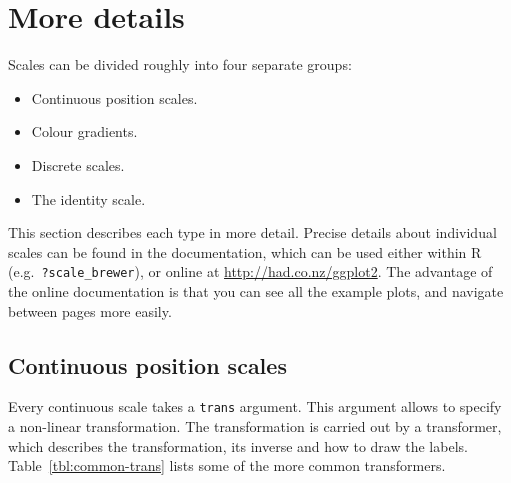 % 



\section{More details}
\label{sec:more-details}

Scales can be divided roughly into four separate groups:

\begin{itemize}
  \item Continuous position scales.
  \item Colour gradients.
  \item Discrete scales.
  \item The identity scale.
\end{itemize}

\noindent  This section describes each type in more detail.  Precise details about individual scales can be found in the documentation, which can be used either within R (e.g.\ {\tt ?scale\_brewer}), or online at  \url{http://had.co.nz/ggplot2}.  The advantage of the online documentation is that you can see all the example plots, and navigate between pages more easily.

\subsection{Continuous position scales}
\label{sub:scale_position}

Every continuous scale takes a {\tt trans} argument.  This argument allows to specify a non-linear transformation.  The transformation is carried out by a transformer, which describes the transformation, its inverse and how to draw the labels. Table~\ref{tbl:common-trans} lists some of the more common transformers. 


